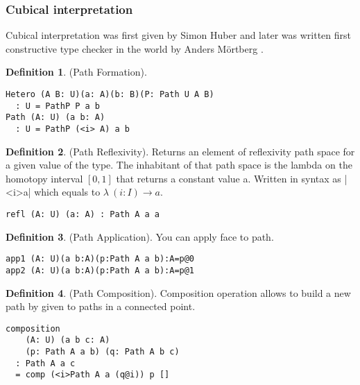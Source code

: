 \documentclass{article}
\theoremstyle{definition}
\newtheorem{definition}{Definition}
\begin{document}
\subsubsection*{Cubical interpretation}

Cubical interpretation was first given by Simon Huber \cite{Huber16} and later was
written first constructive type checker in the world by Anders M{\"{o}}rtberg \cite{Mortberg17}.

\begin{definition} (Path Formation).
\begin{lstlisting}
Hetero (A B: U)(a: A)(b: B)(P: Path U A B)
  : U = PathP P a b
Path (A: U) (a b: A)
  : U = PathP (<i> A) a b
\end{lstlisting}
\end{definition}

\begin{definition} (Path Reflexivity).
Returns an element of reflexivity path space for a given value of the type.
The inhabitant of that path space is the lambda on the homotopy
interval $[0,1]$ that returns a constant value a. Written in
syntax as |<i>a| which equals to $\lambda\ (i: I) \rightarrow a$.
\begin{lstlisting}
refl (A: U) (a: A) : Path A a a
\end{lstlisting}
\end{definition}

\begin{definition} (Path Application).
You can apply face to path.
\begin{lstlisting}
app1 (A: U)(a b:A)(p:Path A a b):A=p@0
app2 (A: U)(a b:A)(p:Path A a b):A=p@1
\end{lstlisting}
\end{definition}

\begin{definition} (Path Composition).
Composition operation allows to build a new path by given to paths
in a connected point.
\begin{center}
\end{center}
\begin{lstlisting}
composition
    (A: U) (a b c: A)
    (p: Path A a b) (q: Path A b c)
  : Path A a c
  = comp (<i>Path A a (q@i)) p []
\end{lstlisting}
\end{definition}
\end{document}
